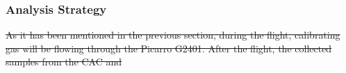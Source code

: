 \documentclass[a4paper,12pt,oneside]{article}
\providecommand{\DIFdeltex}[1]{{\protect\color{red}\sout{#1}}}                      %
\providecommand{\DIFaddbegin}{} %
\providecommand{\DIFaddend}{} %
\providecommand{\DIFdelbegin}{} %
\providecommand{\DIFdelend}{} %
\providecommand{\DIFdel}[1]{\texorpdfstring{\DIFdeltex{#1}}{}} %
\newcommand{\DIFscaledelfig}{0.5}
\newlength{\DIFdelgraphicswidth} %
\newlength{\DIFdelgraphicsheight} %
\newcommand{\DIFaddincludegraphics}[2][]{{\color{blue}\fbox{\DIFOincludegraphics[#1]{#2}}}} %
\newcommand{\DIFdelincludegraphics}[2][]{%
\sbox{\DIFdelgraphicsbox}{\DIFOincludegraphics[#1]{#2}}%
\settoboxwidth{\DIFdelgraphicswidth}{\DIFdelgraphicsbox} %
\settoboxtotalheight{\DIFdelgraphicsheight}{\DIFdelgraphicsbox} %
\scalebox{\DIFscaledelfig}{%
\parbox[b]{\DIFdelgraphicswidth}{\usebox{\DIFdelgraphicsbox}\\[-\baselineskip] \rule{\DIFdelgraphicswidth}{0em}}\llap{\resizebox{\DIFdelgraphicswidth}{\DIFdelgraphicsheight}{%
\setlength{\unitlength}{\DIFdelgraphicswidth}%
\begin{picture}(1,1)%
\thicklines\linethickness{2pt} %
{\color[rgb]{1,0,0}\put(0,0){\framebox(1,1){}}}%
{\color[rgb]{1,0,0}\put(0,0){\line( 1,1){1}}}%
{\color[rgb]{1,0,0}\put(0,1){\line(1,-1){1}}}%
\end{picture}%
}\hspace*{3pt}}} %
} %
\DeclareRobustCommand{\DIFaddbegin}{\DIFOaddbegin \let\includegraphics\DIFaddincludegraphics} %
\DeclareRobustCommand{\DIFaddend}{\DIFOaddend \let\includegraphics\DIFOincludegraphics} %
\DeclareRobustCommand{\DIFdelbegin}{\DIFOdelbegin \let\includegraphics\DIFdelincludegraphics} %
\DeclareRobustCommand{\DIFdelend}{\DIFOaddend \let\includegraphics\DIFOincludegraphics} %
\begin{document}
\subsubsection{Analysis Strategy}\DIFaddbegin \label{sec:analysisstrategy}
\DIFaddend 

\DIFdelbegin \DIFdel{As it has been mentioned in the previous section, during the flight, calibrating gas will be flowing through the Picarro G2401.
After the flight, the collected samples from the CAC and }\DIFdelend %
\DIFaddbegin 




\end{document}
